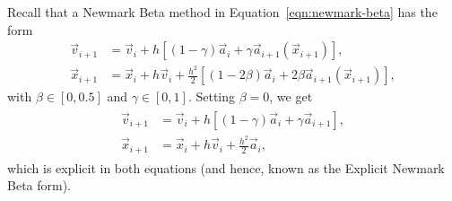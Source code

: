 \documentclass[../Main.tex]{subfiles}
\begin{document}
Recall that a Newmark Beta method in Equation~\ref{eqn:newmark-beta} has the form
\begin{align*}
		\vec{v}_{i+1} & = \vec{v}_{i} + h\left[\left(1-\gamma\right)\vec{a}_{i} + \gamma\vec{a}_{i+1}\left(\vec{x}_{i+1}\right)\right], \\
		\vec{x}_{i+1} & = \vec{x}_{i} + h\vec{v}_{i} + \frac{h^2}{2}\left[\left(1-2\beta \right)\vec{a}_{i} + 2\beta\vec{a}_{i+1}\left(\vec{x}_{i+1}\right)\right], 
\end{align*}with $\beta \in \left[0,0.5\right]$ and $\gamma \in \left[0,1\right]$.
Setting $\beta = 0$, we get
\begin{align}
	\begin{split}
		\vec{v}_{i+1} & = \vec{v}_{i} + h\left[\left(1-\gamma\right)\vec{a}_{i} + \gamma\vec{a}_{i+1}\right], \\
		\vec{x}_{i+1} & = \vec{x}_{i} + h\vec{v}_{i} + \frac{h^2}{2}\vec{a}_{i},
	\end{split} \label{explicit_newmark-beta}  
\end{align}
which is explicit in both equations (and hence, known as the Explicit Newmark Beta form).
\end{document}
